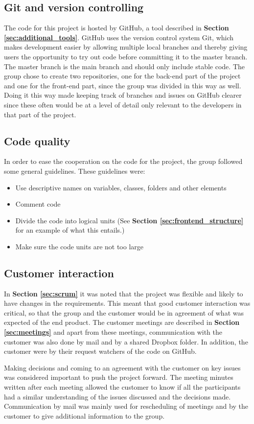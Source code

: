 \subsection{Git and version controlling}

The code for this project is hosted by GitHub, a tool described in \textbf{Section \ref{sec:additional_tools}}. GitHub uses the version control system Git, which makes development easier by allowing multiple local branches and thereby giving users the opportunity to try out code before committing it to the master branch. The master branch is the main branch and should only include stable code. The group chose to create two repositories, one for the back-end part of the project and one for the front-end part, since the group was divided in this way as well. Doing it this way made keeping track of branches and issues on GitHub clearer since these often would be at a level of detail only relevant to the developers in that part of the project. 

\subsection{Code quality}

In order to ease the cooperation on the code for the project, the group followed some general guidelines. These guidelines were:
\begin{itemize}
	\item Use descriptive names on variables, classes, folders and other elements
	\item Comment code
	\item Divide the code into logical units (See \textbf{Section \ref{sec:frontend_structure}} for an example of what this entails.)
	\item Make sure the code units are not too large
\end{itemize}

\subsection{Customer interaction}

In \textbf{Section \ref{sec:scrum}} it was noted that the project was flexible and likely to have changes in the requirements. This meant that good customer interaction was critical, so that the group and the customer would be in agreement of what was expected of the end product. The customer meetings are described in \textbf{Section \ref{sec:meetings}} and apart from these meetings, communication with the customer was also done by mail and by a shared Dropbox folder. In addition, the customer were by their request watchers of the code on GitHub. \newline

Making decisions and coming to an agreement with the customer on key issues was considered important to push the project forward. The meeting minutes written after each meeting allowed the customer to know if all the participants had a similar understanding of the issues discussed and the decisions made. Communication by mail was mainly used for rescheduling of meetings and by the customer to give additional information to the group. 

\cleardoublepage